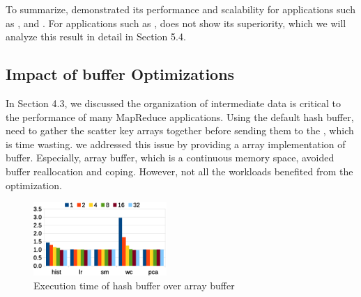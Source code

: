 





To summarize, \myds demonstrated its performance and scalability for applications such as ,  and .
For applications such as , \myds does not show its superiority, which we will analyze this result in detail in Section 5.4.

\subsection{ Impact of buffer Optimizations}
In Section 4.3, we discussed the organization of intermediate data is critical to the performance of many MapReduce applications.
Using the default hash buffer, need to gather the scatter key arrays together before sending them to the , which is time wasting.
we addressed this issue by providing a array implementation of buffer. 
Especially, array buffer, which is a continuous memory space, avoided buffer reallocation and coping.
However, not all the workloads benefited from the optimization.




\begin{figure}[!h!t]  
	\centering
	\includegraphics[width=0.45\textwidth]{eps/smr_diff_buffer.eps}
	\caption{Execution time of hash buffer over array buffer}
	\label{fig:smr:diff:buffer}
\end{figure}


